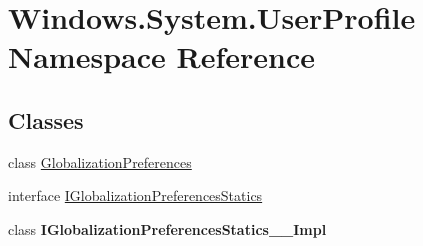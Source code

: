 \hypertarget{namespace_windows_1_1_system_1_1_user_profile}{}\section{Windows.\+System.\+User\+Profile Namespace Reference}
\label{namespace_windows_1_1_system_1_1_user_profile}
\subsection*{Classes}
\begin{DoxyCompactItemize}
\item 
class \hyperlink{class_windows_1_1_system_1_1_user_profile_1_1_globalization_preferences}{Globalization\+Preferences}
\item 
interface \hyperlink{interface_windows_1_1_system_1_1_user_profile_1_1_i_globalization_preferences_statics}{I\+Globalization\+Preferences\+Statics}
\item 
class {\bfseries I\+Globalization\+Preferences\+Statics\+\_\+\+\_\+\+Impl}
\end{DoxyCompactItemize}
